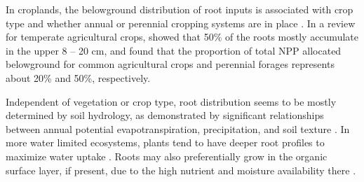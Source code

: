 \documentclass[11pt, oneside, a4paper]{article}   	%
\begin{document}


In croplands, the belowground distribution of root inputs is associated with crop type and whether annual or perennial cropping systems are in place \citep{Mosier2021, HicksPries2023}.
In a review for temperate agricultural crops, \citet{Fan2016} showed that 50\% of the roots mostly accumulate in the upper 8 -- 20 cm, and \citet{Bolinder2007} found that the proportion of total NPP allocated belowground for common agricultural crops and perennial forages represents about 20\% and 50\%, respectively.

Independent of vegetation or crop type, root distribution seems to be mostly determined by soil hydrology, as
demonstrated by significant relationships between annual potential evapotranspiration, precipitation, and soil texture \citep{Schenk2002a}. In more water limited ecosystems, plants tend to have deeper root profiles to maximize water uptake
\citep{Schenk2002b}. Roots may also preferentially grow in the organic surface layer, if present, due to the high nutrient and moisture availability there \citep{Jordan1980, Schenk2002a}.
\end{document}
